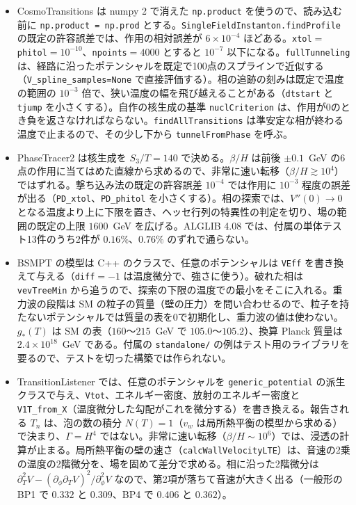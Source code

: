 \documentclass[a4paper,10pt]{ltjsarticle}
\begin{document}
\begin{itemize}
\item CosmoTransitions は numpy 2 で消えた \texttt{np.product} を使うので、読み込む前に \texttt{np.product = np.prod} とする。\texttt{SingleFieldInstanton.findProfile} の既定の許容誤差では、作用の相対誤差が $6\times10^{-4}$ ほどある。\texttt{xtol}$=$\texttt{phitol}$=10^{-10}$、\texttt{npoints}$=4000$ とすると $10^{-7}$ 以下になる。\texttt{fullTunneling} は、経路に沿ったポテンシャルを既定で100点のスプラインで近似する（\texttt{V\_spline\_samples=None} で直接評価する）。相の追跡の刻みは既定で温度の範囲の $10^{-3}$ 倍で、狭い温度の幅を飛び越えることがある（\texttt{dtstart} と \texttt{tjump} を小さくする）。自作の核生成の基準 \texttt{nuclCriterion} は、作用が0のとき負を返さなければならない。\texttt{findAllTransitions} は準安定な相が終わる温度で止まるので、その少し下から \texttt{tunnelFromPhase} を呼ぶ。
\item PhaseTracer2 は核生成を $S_3/T=140$ で決める。$\beta/H$ は前後 $\pm0.1$~GeV の6点の作用に当てはめた直線から求めるので、非常に速い転移（$\beta/H\gtrsim10^4$）ではずれる。撃ち込み法の既定の許容誤差 $10^{-4}$ では作用に $10^{-3}$ 程度の誤差が出る（\texttt{PD\_xtol}、\texttt{PD\_phitol} を小さくする）。相の探索では、$V''(0)\to0$ となる温度より上に下限を置き、ヘッセ行列の特異性の判定を切り、場の範囲の既定の上限 $1600$~GeV を広げる。ALGLIB 4.08 では、付属の単体テスト13件のうち2件が $0.16\%$、$0.76\%$ のずれで通らない。
\item BSMPT の模型は C++ のクラスで、任意のポテンシャルは \texttt{VEff} を書き換えて与える（\texttt{diff}$=-1$ は温度微分で、強さに使う）。破れた相は \texttt{vevTreeMin} から追うので、探索の下限の温度での最小をそこに入れる。重力波の段階は SM の粒子の質量（壁の圧力）を問い合わせるので、粒子を持たないポテンシャルでは質量の表を0で初期化し、重力波の値は使わない。$g_*(T)$ は SM の表（$160$〜$215$~GeV で $105.0$〜$105.2$）、換算 Planck 質量は $2.4\times10^{18}$~GeV である。付属の \nolinkurl{standalone/} の例はテスト用のライブラリを要るので、テストを切った構築では作られない。
\item TransitionListener では、任意のポテンシャルを \texttt{generic\_potential} の派生クラスで与え、\texttt{Vtot}、エネルギー密度、放射のエネルギー密度と \texttt{V1T\_from\_X}（温度微分した勾配がこれを微分する）を書き換える。報告される $T_n$ は、泡の数の積分 $N(T)=1$（$v_w$ は局所熱平衡の模型から求める）で決まり、$\Gamma=H^4$ ではない。非常に速い転移（$\beta/H\sim10^6$）では、浸透の計算が止まる。局所熱平衡の壁の速さ（\texttt{calcWallVelocityLTE}）は、音速の2乗の温度の2階微分を、場を固めて差分で求める。相に沿った2階微分は $\partial_T^2V-(\partial_\phi\partial_TV)^2/\partial_\phi^2V$ なので、第2項が落ちて音速が大きく出る（一般形の BP1 で $0.332$ と $0.309$、BP4 で $0.406$ と $0.362$）。

\end{itemize}
\end{document}
